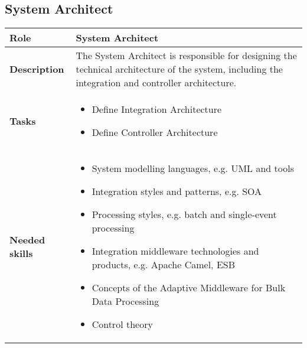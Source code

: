 \subsection{System Architect} 
\begin{minipage}{\textwidth}
\label{table:ch6_Role_System_Architect}
\begin{tabular}
	{|m{2cm}|m{10cm}|} \hline \bfseries Role & System Architect\\
	\hline \bfseries Description & The System Architect is responsible for designing the technical architecture of the system, including the integration and controller architecture.\\
	\hline \bfseries Tasks & 
	\begin{itemize}
		\item Define Integration Architecture
		\item Define Controller Architecture
	\end{itemize}
	\\
	\hline
	\bfseries Needed skills & 
	\begin{itemize}
		\item System modelling languages, e.g. \ac{UML} and tools
		\item Integration styles and patterns, e.g. \ac{SOA}
		\item Processing styles, e.g. batch and single-event processing
		\item Integration middleware technologies and products, e.g. Apache Camel, \ac{ESB}
		\item Concepts of the Adaptive Middleware for Bulk Data Processing
		\item Control theory
	\end{itemize}
	\\
	\hline
\end{tabular}
\end{minipage}


